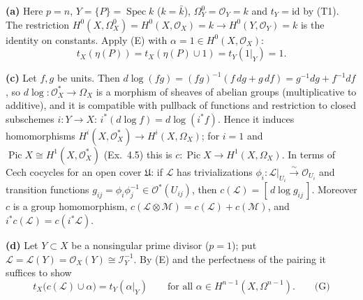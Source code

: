 \documentclass[11pt]{article}
\begin{document}
\medskip\noindent\textbf{(a)} Here $p=n$, $Y=\{P\}=\operatorname{Spec}k$ ($k=\bar k$), $\Omega^0_Y=\mathcal O_Y=k$ and $t_Y=\mathrm{id}$ by (T1). The restriction $H^0(X,\Omega^0_X)=H^0(X,\mathcal O_X)=k\to H^0(Y,\mathcal O_Y)=k$ is the identity on constants. Apply (E) with $\alpha=1\in H^0(X,\mathcal O_X)$:
\[
t_X(\eta(P))=t_X(\eta(P)\cup1)=t_Y(1|_Y)=1 .
\]

\medskip\noindent\textbf{(c)} Let $f,g$ be units. Then $d\log(fg)=(fg)^{-1}(f\,dg+g\,df)=g^{-1}dg+f^{-1}df$, so $d\log\colon\mathcal O_X^*\to\Omega_X$ is a morphism of sheaves of abelian groups (multiplicative to additive), and it is compatible with pullback of functions and restriction to closed subschemes $i\colon Y\to X$: $i^*(d\log f)=d\log(i^*f)$. Hence it induces homomorphisms $H^i(X,\mathcal O_X^*)\to H^i(X,\Omega_X)$; for $i=1$ and $\operatorname{Pic}X\cong H^1(X,\mathcal O_X^*)$ (Ex.~4.5) this is $c\colon\operatorname{Pic}X\to H^1(X,\Omega_X)$. In terms of Cech cocycles for an open cover $\mathfrak U$: if $\mathcal L$ has trivializations $\phi_i\colon\mathcal L|_{U_i}\xrightarrow{\sim}\mathcal O_{U_i}$ and transition functions $g_{ij}=\phi_i\phi_j^{-1}\in\mathcal O^*(U_{ij})$, then $c(\mathcal L)=[\,d\log g_{ij}\,]$. Moreover $c$ is a group homomorphism, $c(\mathcal L\otimes\mathcal M)=c(\mathcal L)+c(\mathcal M)$, and $i^*c(\mathcal L)=c(i^*\mathcal L)$.

\medskip\noindent\textbf{(d)} Let $Y\subset X$ be a nonsingular prime divisor ($p=1$); put $\mathcal L=\mathcal L(Y)=\mathcal O_X(Y)\cong\mathcal I_Y^{-1}$. By (E) and the perfectness of the pairing it suffices to show
\[
t_X\big(c(\mathcal L)\cup\alpha\big)=t_Y(\alpha|_Y)\qquad\text{for all }\alpha\in H^{n-1}(X,\Omega^{n-1}).\qquad\text{(G)}
\]
\end{document}
